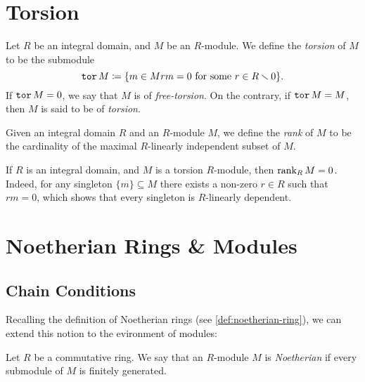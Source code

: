 \section{Torsion}

\begin{definition}[Torsion]
\label{def:torsion-module}
Let \(R\) be an integral domain, and \(M\) be an \(R\)-module. We define the
\emph{torsion} of \(M\) to be the submodule
\[
\operatorname{\texttt{tor}} M \coloneq
\{m \in M \relax r m = 0 \text{ for some } r \in R \smallsetminus 0\}.
\]
If \(\operatorname{\texttt{tor}} M = 0\), we say that \(M\) is of \emph{free-torsion}. On the
contrary, if \(\operatorname{\texttt{tor}} M = M\), then \(M\) is said to be of \emph{torsion}.
\end{definition}

\begin{definition}[Rank]
\label{def:rank-of-general-module}
Given an integral domain \(R\) and an \(R\)-module \(M\), we define the
\emph{rank} of \(M\) to be the cardinality of the maximal \(R\)-linearly
independent subset of \(M\).
\end{definition}

\begin{example}
\label{exp:torsion-module-has-rank-zero}
If \(R\) is an integral domain, and \(M\) is a torsion \(R\)-module, then
\(\operatorname{rank}_R M = 0\). Indeed, for any singleton \(\{m\} \subseteq M\) there exists
a non-zero \(r \in R\) such that \(r m = 0\), which shows that every singleton
is \(R\)-linearly dependent.
\end{example}

\section{Noetherian Rings \& Modules}

\subsection{Chain Conditions}

Recalling the definition of Noetherian rings (see \cref{def:noetherian-ring}),
we can extend this notion to the evironment of modules:

\begin{definition}
\label{def:noetherian-module}
Let \(R\) be a commutative ring. We say that an \(R\)-module \(M\) is
\emph{Noetherian} if every submodule of \(M\) is finitely generated.
\end{definition}

